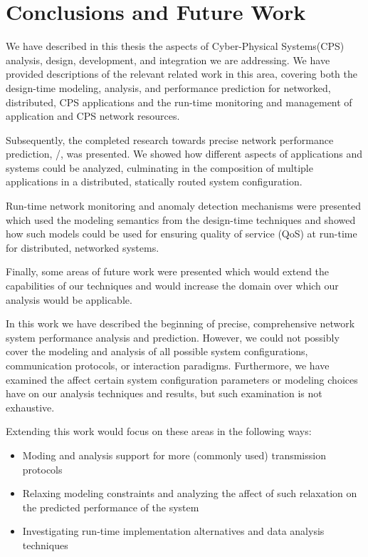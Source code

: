 \chapter{Conclusions and Future Work}
\label{ch:conclusions}

We have described in this thesis the aspects of Cyber-Physical
Systems(CPS) analysis, design, development, and integration we are
addressing.  We have provided descriptions of the relevant related
work in this area, covering both the design-time modeling, analysis,
and performance prediction for networked, distributed, CPS
applications and the run-time monitoring and management of application
and CPS network resources.

Subsequently, the completed research towards precise network
performance prediction, \shorttool/, was presented.  We showed how
different aspects of applications and systems could be analyzed,
culminating in the composition of multiple applications in a
distributed, statically routed system configuration.

Run-time network monitoring and anomaly detection mechanisms were
presented which used the modeling semantics from the design-time
techniques and showed how such models could be used for ensuring
quality of service (QoS) at run-time for distributed, networked
systems.

Finally, some areas of future work were presented which would extend
the capabilities of our techniques and would increase the domain over
which our analysis would be applicable.

In this work we have described the beginning of precise, comprehensive
network system performance analysis and prediction.  However, we could
not possibly cover the modeling and analysis of all possible system
configurations, communication protocols, or interaction paradigms.
Furthermore, we have examined the affect certain system configuration
parameters or modeling choices have on our analysis techniques and
results, but such examination is not exhaustive.

Extending this work would focus on these areas in the following ways:

\begin{itemize}
  \item Moding and analysis support for more (commonly used)
    transmission protocols
  \item Relaxing modeling constraints and analyzing the affect of such
    relaxation on the predicted performance of the system
  \item Investigating run-time implementation alternatives and data
    analysis techniques
\end{itemize}

